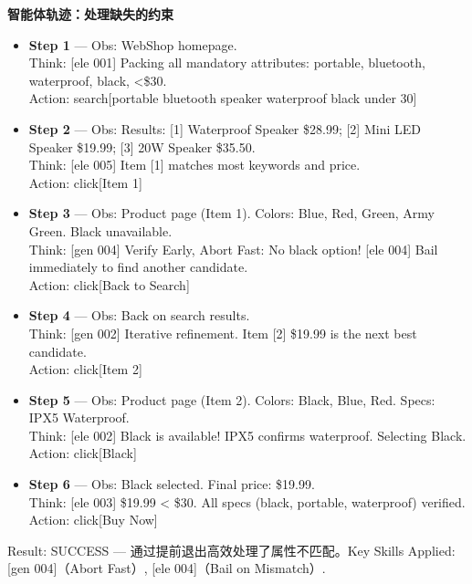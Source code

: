 \documentclass[11pt,UTF8,fontset=fandol]{ctexart}
\begin{document}
\textbf{智能体轨迹：处理缺失的约束}
\begin{itemize}[leftmargin=1.5em,itemsep=0.2em]
\item \textbf{Step 1} — Obs: WebShop homepage.\\
  Think: [ele 001] Packing all mandatory attributes: portable, bluetooth, waterproof, black, <\$30.\\
  Action: search[portable bluetooth speaker waterproof black under 30]
\item \textbf{Step 2} — Obs: Results: [1] Waterproof Speaker \$28.99; [2] Mini LED Speaker \$19.99; [3] 20W Speaker \$35.50.\\
  Think: [ele 005] Item [1] matches most keywords and price.\\
  Action: click[Item 1]
\item \textbf{Step 3} — Obs: Product page (Item 1). Colors: Blue, Red, Green, Army Green. Black unavailable.\\
  Think: [gen 004] Verify Early, Abort Fast: No black option! [ele 004] Bail immediately to find another candidate.\\
  Action: click[Back to Search]
\item \textbf{Step 4} — Obs: Back on search results.\\
  Think: [gen 002] Iterative refinement. Item [2] \$19.99 is the next best candidate.\\
  Action: click[Item 2]
\item \textbf{Step 5} — Obs: Product page (Item 2). Colors: Black, Blue, Red. Specs: IPX5 Waterproof.\\
  Think: [ele 002] Black is available! IPX5 confirms waterproof. Selecting Black.\\
  Action: click[Black]
\item \textbf{Step 6} — Obs: Black selected. Final price: \$19.99.\\
  Think: [ele 003] \$19.99 < \$30. All specs (black, portable, waterproof) verified.\\
  Action: click[Buy Now]
\end{itemize}
Result: SUCCESS — 通过提前退出高效处理了属性不匹配。Key Skills Applied: [gen 004]（Abort Fast）, [ele 004]（Bail on Mismatch）.
\end{document}
